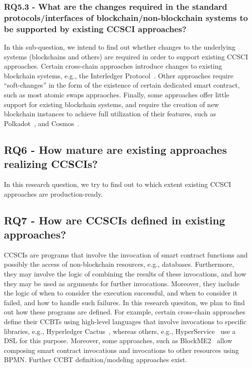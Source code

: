 \documentclass[review]{elsarticle}
\begin{document}
\subsubsection*{RQ5.3 -  What are the changes required in the standard protocols/interfaces of blockchain/non-blockchain systems to be supported by existing CCSCI approaches?}
In this sub-question, we intend to find out whether changes to the underlying systems (blockchains and others) are required in order to support existing CCSCI approaches.
Certain cross-chain approaches introduce changes to existing blockchain systems, e.g., the Interledger Protocol~\cite{Hope-Bailie2016Interledger}.
Other approaches require \enquote{soft-changes} in the form of the existence of certain dedicated smart contract, such as most atomic swaps appraoches.
Finally, some approaches offer little support for existing blockchain systems, and require the creation of new blockchain instances to achieve full utilization of their features, such as Polkadot~\cite{Wood2016Polkadot}, and Cosmos~\cite{Kwon2019Cosmos}.

\subsection*{RQ6 - How mature are existing approaches realizing CCSCIs?}
In this research question, we try to find out to which extent existing CCSCI approaches are production-ready.

\subsection*{RQ7 - How are CCSCIs defined in existing approaches?}
CCSCIs are programs that involve the invocation of smart contract functions and possibly the access of non-blockchain resources, e.g., databases.
Furthermore, they may involve the logic of combining the results of these invocations, and how they may be used as arguments for further invocations.
Moreover, they include the logic of when to consider the execution successful, and when to consider it failed, and how to handle such failures.
In this research quesiton, we plan to find out how these programs are defined.
For example, certain cross-chain approaches define their CCBTs using high-level languages that involve invocations to specific libraries, e.g., Hyperledger Cactus~\cite{Montgomery2020Cactus}, whereas others, e.g., HyperService~\cite{Liu2019Hyperservice} use a DSL for this purpose.
Moreover, some approaches, such as BlockME2~\cite{Falazi2019_SmartContractComposition} allow composing smart contract invocations and invocations to other resources using BPMN.
Further CCBT definition/modeling approaches exist.
\end{document}
